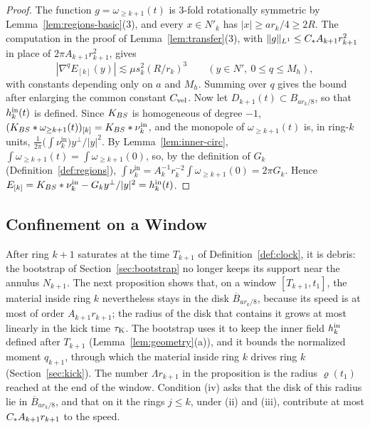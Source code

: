 \begin{proof}
The function $g=\omega_{\ge k+1}(t)$ is $3$-fold
rotationally symmetric by Lemma~\ref{lem:regions-basic}(3), and every $x\in N'_k$ has
$|x|\ge ar_k/4\ge2R$. The computation in the proof of
Lemma~\ref{lem:transfer}(3), with $\|g\|_{L^1}\le C_{*} A_{k+1}r_{k+1}^2$ in
place of $2\pi A_{k+1}r_{k+1}^2$, gives
\[
|\nabla^qE_{[k]}(y)|\lesssim\mu s_k^2(R/r_k)^3\qquad(y\in N',\ 0\le q\le M_h),
\]
with constants depending only on $a$ and $M_h$. Summing over $q$
gives the bound after enlarging the common constant $C_{\mathrm{vel}}$. Now let
$D_{k+1}(t)\subset B_{ar_k/8}$, so that $h^{\mathrm{in}}_k(t)$ is defined. Since $K_{BS}$
is homogeneous of degree $-1$, $(K_{BS}\ast\omega_{\ge k+1}(t))_{[k]}=K_{BS}\ast\nu^{\mathrm{in}}_k$, and the
monopole of $\omega_{\ge k+1}(t)$ is, in ring-$k$ units,
$\frac1{2\pi}\big(\int\nu^{\mathrm{in}}_k\big)y^\perp/|y|^2$. By
Lemma~\ref{lem:inner-circ}, $\int\omega_{\ge k+1}(t)=\int\omega_{\ge k+1}(0)$, so,
by the definition of $G_k$ (Definition~\ref{def:regions}),
$\int\nu^{\mathrm{in}}_k=A_k^{-1}r_k^{-2}\int\omega_{\ge k+1}(0)=2\pi G_k$. Hence
$E_{[k]}=K_{BS}\ast\nu^{\mathrm{in}}_k-G_ky^\perp/|y|^2=h^{\mathrm{in}}_k(t)$.
\end{proof}

\subsection{Confinement on a Window}

After ring $k+1$ saturates at the time $T_{k+1}$ of Definition~\ref{def:clock},
it is debris: the bootstrap of Section~\ref{sec:bootstrap} no
longer keeps its support near the annulus $N_{k+1}$. The next proposition shows
that, on a window $[T_{k+1},t_1]$, the material inside ring $k$ nevertheless
stays in the disk $\overline B_{ar_k/8}$, because its speed is at most of
order $A_{k+1}r_{k+1}$; the radius of the disk that contains it grows at most
linearly in the kick time $\tau_{\mathrm{K}}$. The bootstrap uses it to keep the inner field
$h^{\mathrm{in}}_k$ defined after $T_{k+1}$ (Lemma~\ref{lem:geometry}\textup{(a)}), and it
bounds the normalized moment $q_{k+1}$, through which the material inside ring
$k$ drives ring $k$ (Section~\ref{sec:kick}). The number $\Lambda r_{k+1}$ in
the proposition is the radius $\varrho(t_1)$ reached at the end of the window.
Condition \textup{(iv)} asks that the disk of this radius lie in
$\overline B_{ar_k/8}$, and that on it the rings $j\le k$, under \textup{(ii)}
and \textup{(iii)}, contribute at most $C_{*} A_{k+1}r_{k+1}$ to the speed.

